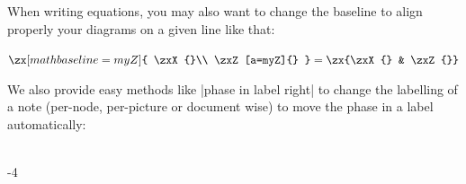\documentclass[a4paper]{ltxdoc}
\begin{document}
When writing equations, you may also want to change the baseline to align properly your diagrams on a given line like that:
\begin{codeexample}[]
  $\zx[math baseline=myZ]{
    \zxX{}\\
    \zxZ[a=myZ]{}
  }
  = \zx{\zxX{} & \zxZ{}}$
\end{codeexample}

We also provide easy methods like |phase in label right| to change the labelling of a note (per-node, per-picture or document wise) to move the phase in a label automatically:
\begin{codeexample}[]
  \begin{ZX}
    \zxZ{\alpha} \arrow[d] \\
    \zxFracX-{\pi}{4}
  \end{ZX}
\end{codeexample}
\end{document}
